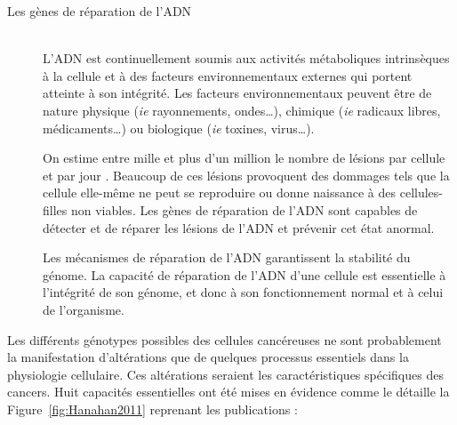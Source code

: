 			\begin{description}
				\item [Les gènes de réparation de l'\acs{ADN}]  \hfill \\
					L'\acs{ADN} est continuellement soumis aux activités métaboliques intrinsèques à la cellule et à des facteurs environnementaux externes qui portent atteinte à son intégrité.
					Les facteurs environnementaux peuvent être de nature physique (\emph{ie} rayonnements, ondes\dots), chimique (\emph{ie} radicaux libres, médicaments\dots) ou biologique (\emph{ie} toxines, virus\dots).

					On estime entre mille et plus d'un million le nombre de lésions par cellule et par jour \citep{Ames1993}.
					Beaucoup de ces lésions provoquent des dommages tels que la cellule elle-même ne peut se reproduire ou donne naissance à des cellules-filles non viables.
					Les gènes de réparation de l'\acs{ADN} sont capables de détecter et de réparer les lésions de l'\acs{ADN} et prévenir cet état anormal.

					Les mécanismes de réparation de l'\acs{ADN} garantissent la stabilité du génome.
					La capacité de réparation de l'\acs{ADN} d'une cellule est essentielle à l'intégrité de son génome, et donc à son fonctionnement normal et à celui de l'organisme.
			\end{description}

			Les différents génotypes possibles des cellules cancéreuses ne sont probablement la manifestation d'altérations que de quelques processus essentiels dans la physiologie cellulaire.
			Ces altérations seraient les caractéristiques spécifiques des cancers.
			Huit capacités essentielles ont été mises en évidence comme le détaille la Figure~\ref{fig:Hanahan2011} reprenant les publications \citet{Hanahan2000,Hanahan2011} :

			\begin{sidewaysfigure}
				\begin{center}
					\def\svgwidth{\columnwidth}
					
					\caption{Caractéristiques du Cancer.}
					\label{fig:Hanahan2011}
					\caption*{Figure inspirée de \citeauthor{Hanahan2000,Hanahan2011}.}
				\end{center}
			\end{sidewaysfigure}

